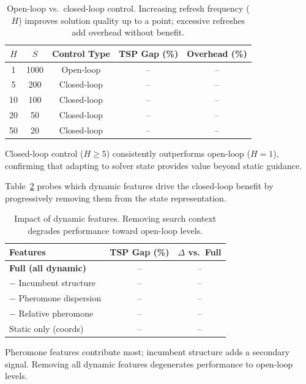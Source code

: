\documentclass[sigconf,anonymous,review]{acmart}
\theoremstyle{definition}
\theoremstyle{plain}
\newcommand{\TSP}{\textsc{TSP}}
\begin{document}
\begin{table}[t]
\centering
\caption{Open-loop vs.\ closed-loop control. Increasing refresh frequency ($H$) improves solution quality up to a point; excessive refreshes add overhead without benefit.}
\label{tab:ablation-refresh}
\small
\begin{tabular}{ccccc}
\toprule
$H$ & $S$ & Control Type & \TSP{} Gap (\%) & Overhead (\%) \\
\midrule
1 & 1000 & Open-loop & -- & -- \\
5 & 200 & Closed-loop & -- & -- \\
10 & 100 & Closed-loop & -- & -- \\
20 & 50 & Closed-loop & -- & -- \\
50 & 20 & Closed-loop & -- & -- \\
\bottomrule
\end{tabular}
\end{table}

Closed-loop control ($H \ge 5$) consistently outperforms open-loop ($H=1$), confirming that adapting to solver state provides value beyond static guidance.

Table~\ref{tab:ablation-features} probes which dynamic features drive the closed-loop benefit by progressively removing them from the state representation.

\begin{table}[t]
\centering
\caption{Impact of dynamic features. Removing search context degrades performance toward open-loop levels.}
\label{tab:ablation-features}
\small
\begin{tabular}{lcc}
\toprule
Features & \TSP{} Gap (\%) & $\Delta$ vs.\ Full \\
\midrule
\textbf{Full (all dynamic)} & -- & -- \\
$-$ Incumbent structure & -- & -- \\
$-$ Pheromone dispersion & -- & -- \\
$-$ Relative pheromone & -- & -- \\
Static only (coords) & -- & -- \\
\bottomrule
\end{tabular}
\end{table}

Pheromone features contribute most; incumbent structure adds a secondary signal.
Removing all dynamic features degenerates performance to open-loop levels.
\end{document}

